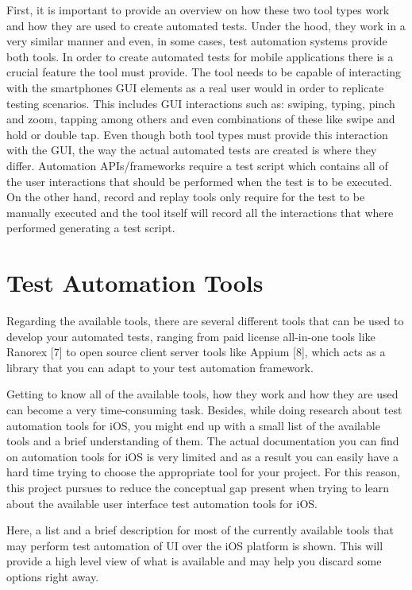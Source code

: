First, it is important to provide an overview on how these two tool types work and how they are used to create automated tests. Under the hood, they work in a very similar manner and even, in some cases, test automation systems provide both tools. In order to create automated tests for mobile applications there is a crucial feature the tool must provide. The tool needs to be capable of interacting with the smartphones GUI elements as a real user would in order to replicate testing scenarios. This includes GUI interactions such as: swiping, typing, pinch and zoom, tapping among others and even combinations of these like swipe and hold or double tap. Even though both tool types must provide this interaction with the GUI, the way the actual automated tests are created is where they differ. Automation APIs/frameworks require a test script which contains all of the user interactions that should be performed when the test is to be executed. On the other hand, record and replay tools only require for the test to be manually executed and the tool itself will record all the interactions that where performed generating a test script.


\section{Test Automation Tools}

Regarding the available tools, there are several different tools that can be used to develop your automated tests, ranging from paid license all-in-one tools like Ranorex [7] to open source client server tools like Appium [8], which acts as a library that you can adapt to your test automation framework. 

Getting to know all of the available tools, how they work and how they are used can become a very time-consuming task. Besides, while doing research about test automation tools for iOS, you might end up with a small list of the available tools and a brief understanding of them. The actual documentation you can find on automation tools for iOS is very limited and as a result you can easily have a hard time trying to choose the appropriate tool for your project. For this reason, this project pursues to reduce the conceptual gap present when trying to learn about the available user interface test automation tools for iOS.

Here, a list and a brief description for most of the currently available tools that may perform test automation of UI over the iOS platform is shown. This will provide a high level view of what is available and may help you discard some options right away.


